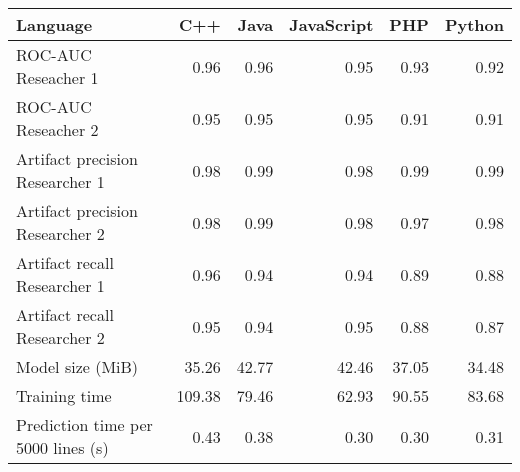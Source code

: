 \begin{tabular}{lrrrrr}
\toprule
Language &    C++ &  Java &  JavaScript &   PHP &  Python \\
\midrule
ROC-AUC Reseacher 1                &   0.96 &  0.96 &        0.95 &  0.93 &    0.92 \\
ROC-AUC Reseacher 2                &   0.95 &  0.95 &        0.95 &  0.91 &    0.91 \\
Artifact precision Researcher 1    &   0.98 &  0.99 &        0.98 &  0.99 &    0.99 \\
Artifact precision Researcher 2    &   0.98 &  0.99 &        0.98 &  0.97 &    0.98 \\
Artifact recall Researcher 1       &   0.96 &  0.94 &        0.94 &  0.89 &    0.88 \\
Artifact recall Researcher 2       &   0.95 &  0.94 &        0.95 &  0.88 &    0.87 \\
Model size (MiB)                   &  35.26 & 42.77 &       42.46 & 37.05 &   34.48 \\
Training time                      & 109.38 & 79.46 &       62.93 & 90.55 &   83.68 \\
Prediction time per 5000 lines (s) &   0.43 &  0.38 &        0.30 &  0.30 &    0.31 \\
\bottomrule
\end{tabular}
